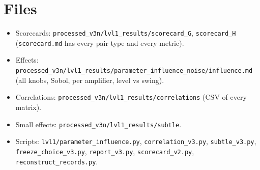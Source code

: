 \documentclass[11pt]{article}
\begin{document}
\section{Files}
\begin{itemize}
\item Scorecards: \texttt{processed\_v3n/lvl1\_results/scorecard\_G}, \texttt{scorecard\_H} (\texttt{scorecard.md} has
  every pair type and every metric).
\item Effects: \texttt{processed\_v3n/lvl1\_results/parameter\_influence\_noise/influence.md} (all knobs, Sobol, per
  amplifier, level vs swing).
\item Correlations: \texttt{processed\_v3n/lvl1\_results/correlations} (CSV of every matrix).
\item Small effects: \texttt{processed\_v3n/lvl1\_results/subtle}.
\item Scripts: \texttt{lvl1/parameter\_influence.py}, \texttt{correlation\_v3.py}, \texttt{subtle\_v3.py},
  \texttt{freeze\_choice\_v3.py}, \texttt{report\_v3.py}, \texttt{scorecard\_v2.py}, \texttt{reconstruct\_records.py}.
\end{itemize}
\end{document}

